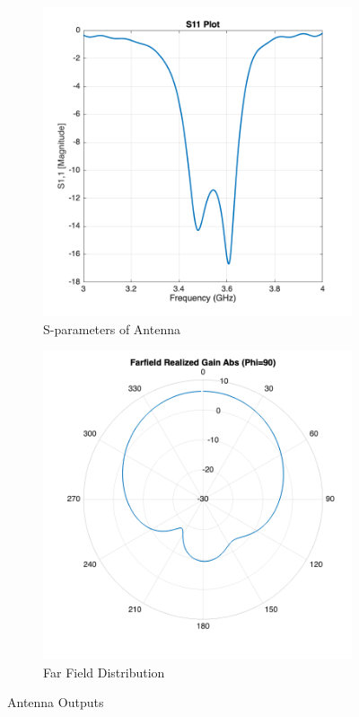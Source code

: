 \begin{figure}[htbp]
    \centering
    \begin{subfigure}[b]{0.49\textwidth}
        \centering
        \includegraphics[width=\textwidth]{images/antenna/S11.png}
        \caption{S-parameters of Antenna}
        \label{fig:antenna_s}
    \end{subfigure}
    \hfill %
    \begin{subfigure}[b]{0.49\textwidth}
        \centering
        \includegraphics[width=\textwidth]{images/antenna/FF_p.png}
        \caption{Far Field Distribution}
        \label{fig:antenna_ff}
    \end{subfigure}
    \caption{Antenna Outputs}
    \label{fig:ant}
\end{figure}


